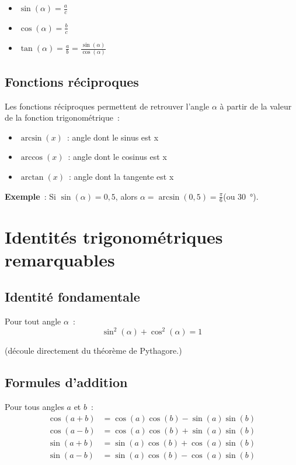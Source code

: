 \documentclass{article}
\begin{document}
\begin{itemize}
    \item \(\sin(\alpha) = \frac{a}{c}\)
    \item \(\cos(\alpha) = \frac{b}{c}\)
    \item \(\tan(\alpha) = \frac{a}{b} = \frac{\sin(\alpha)}{\cos(\alpha)}\)
\end{itemize}

\subsection{Fonctions réciproques}
Les fonctions réciproques permettent de retrouver l'angle $\alpha$ à partir de la valeur de la fonction trigonométrique~:
\begin{itemize}
    \item $\arcsin(x)$~: angle dont le sinus est  x
    \item $\arccos(x)$~: angle dont le cosinus est  x
    \item $\arctan(x)$~: angle dont la tangente est  x
\end{itemize}

\smallskip
\textbf{Exemple}~:
Si $\sin(\alpha) = 0{,}5$, alors $\alpha = \arcsin(0{,}5) = \frac{\pi}{6}$(ou \SI{30}{\degree}).

\section{Identités trigonométriques remarquables}

\subsection{Identité fondamentale}  

Pour tout angle  $\alpha$~:  
\[
\sin^2(\alpha) + \cos^2(\alpha) = 1  
\]

(découle directement du théorème de Pythagore.)

\subsection{Formules d'addition}  
Pour tous angles  $a$  et  $b$~:  
\begin{align*}  
    \cos(a + b) &= \cos(a)\cos(b) - \sin(a)\sin(b) \\
    \cos(a - b) &= \cos(a)\cos(b) + \sin(a)\sin(b) \\
    \sin(a + b) &= \sin(a)\cos(b) + \cos(a)\sin(b) \\
    \sin(a - b) &= \sin(a)\cos(b) - \cos(a)\sin(b)
\end{align*}
\end{document}
